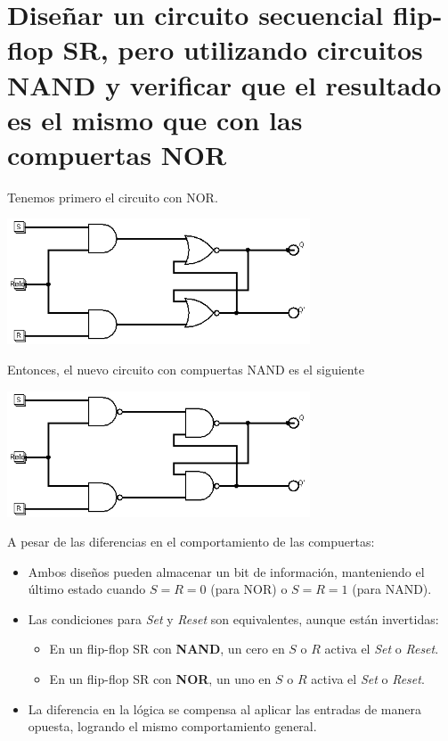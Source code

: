 \documentclass[11pt,letterpaper]{article}
\begin{document}
\section*{Diseñar un circuito secuencial flip-flop SR, pero utilizando circuitos NAND y verificar que el resultado es el mismo que con las compuertas NOR}
Tenemos primero el circuito con NOR.
\begin{center}
  \includegraphics[width=9cm]{./imagenes/Ej50.png}
\end{center}
Entonces, el nuevo circuito con compuertas NAND es el siguiente
\begin{center}
  \includegraphics[width=9cm]{./imagenes/Ej5.png}
\end{center}
A pesar de las diferencias en el comportamiento de las compuertas:

\begin{itemize}
    \item Ambos diseños pueden almacenar un bit de información, manteniendo el último estado cuando $S = R = 0$ (para NOR) o $S = R = 1$ (para NAND).
    \item Las condiciones para \textit{Set} y \textit{Reset} son equivalentes, aunque están invertidas:
    \begin{itemize}
        \item En un flip-flop SR con \textbf{NAND}, un cero en $S$ o $R$ activa el \textit{Set} o \textit{Reset}.
        \item En un flip-flop SR con \textbf{NOR}, un uno en $S$ o $R$ activa el \textit{Set} o \textit{Reset}.
    \end{itemize}
    \item La diferencia en la lógica se compensa al aplicar las entradas de manera opuesta, logrando el mismo comportamiento general.
\end{itemize}
\end{document}
